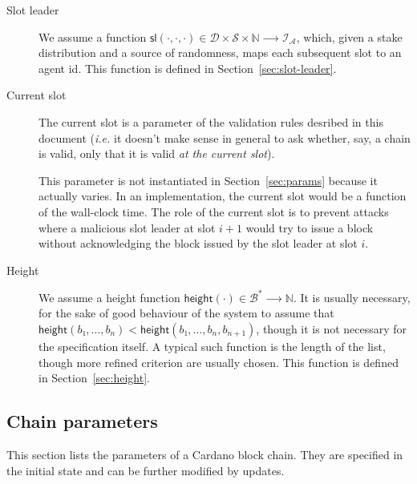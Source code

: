 \documentclass{article}
\newcommand{\lists}[1]{{#1}^*}
\newcommand{\idsof}[1]{\mathcal{I}\!_#1}
\newcommand{\blocks}{\mathcal{B}}
\newcommand{\agentids}{\idsof{\mathcal{A}}}
\newcommand{\slotleader}[3]{\mathsf{sl}(#1,#2,#3)}
\newcommand{\stakedistributions}{\mathcal{D}}
\newcommand{\seeds}{\mathcal{S}}
\newcommand{\height}[1]{\mathsf{height}(#1)}
\begin{document}
\begin{description}
\item[Slot leader] We assume a function
  $\slotleader{⋅}{⋅}{⋅} ∈ \stakedistributions×\seeds×ℕ ⟶ \agentids$,
  which, given a stake distribution and a source of randomness, maps
  each subsequent slot to an agent id. This function is defined in
  Section~\ref{sec:slot-leader}.

\item[Current slot] The current slot is a parameter of the validation
  rules desribed in this document (\emph{i.e.} it doesn't make sense
  in general to ask whether, say, a chain is valid, only that it is
  valid \emph{at the current slot}).

  This parameter is not instantiated in Section~\ref{sec:params}
  because it actually varies. In an implementation, the current slot
  would be a function of the wall-clock time. The role of the current
  slot is to prevent attacks where a malicious slot leader at slot
  $i+1$ would try to issue a block without acknowledging the block
  issued by the slot leader at slot $i$.

\item[Height] We assume a height function
  $\height{⋅} ∈ \lists{\blocks} ⟶ ℕ$. It is usually necessary, for the
  sake of good behaviour of the system to assume that
  $\height{b₁,…,b_n} < \height{b₁,…,b_n,b_{n+1}}$, though it is not
  necessary for the specification itself. A typical such function is
  the length of the list, though more refined criterion are usually
  chosen. This function is defined in Section~\ref{sec:height}.
\end{description}

\subsection{Chain parameters}
\label{sec:chain-parameters}

This section lists the parameters of a Cardano block chain. They are
specified in the initial state and can be further modified by updates.
\end{document}
